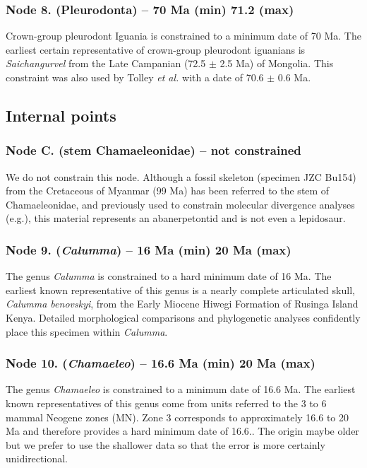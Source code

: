 \documentclass[a4paper, 12pt]{article}
\begin{document}
\subsubsection*{Node 8. (Pleurodonta) – 70 Ma (min) 71.2 (max)}
Crown-group pleurodont Iguania is constrained to a minimum date of 70 Ma. The earliest certain representative of crown-group pleurodont iguanians is \textit{Saichangurvel}\cite{conrad2007complete} from the Late Campanian (72.5 $\pm$ 2.5 Ma) of Mongolia. This constraint was also used by Tolley \textit{et al.}\cite{tolley2013large} with a date of 70.6 $\pm$ 0.6 Ma.
 
\subsection{Internal points}
\subsubsection*{Node C. (stem Chamaeleonidae) – not constrained}
We do not constrain this node. Although a fossil skeleton (specimen JZC Bu154) from the Cretaceous of Myanmar (99 Ma) has been referred to the stem of Chamaeleonidae\cite{daza2016mid}, and previously used to constrain molecular divergence analyses (e.g.\cite{skawinski2017evolution}), this material represents an abanerpetontid and is not even a lepidosaur\cite{daza2020enigmatic}.
 
\subsubsection*{Node 9. (\textit{Calumma}) – 16 Ma (min) 20 Ma (max)}
The genus \textit{Calumma} is constrained to a hard minimum date of 16 Ma. The earliest known representative of this genus is a nearly complete articulated skull, \textit{Calumma benovskyi}, from the Early Miocene Hiwegi Formation of Rusinga Island Kenya\cite{vcervnansky2020only}. Detailed morphological comparisons and phylogenetic analyses confidently place this specimen within \textit{Calumma}\cite{vcervnansky2020only}.
 
\subsubsection*{Node 10. (\textit{Chamaeleo}) – 16.6 Ma (min) 20 Ma (max)}
The genus \textit{Chamaeleo} is constrained to a minimum date of 16.6 Ma. The earliest known representatives of this genus come from units referred to the 3 to 6 mammal Neogene zones (MN)\cite{vcervnansky2010revision,bolet2013fossil}. Zone 3 corresponds to approximately 16.6 to 20 Ma and therefore provides a hard minimum date of 16.6.\cite{van2011biostratigraphy}. The origin maybe older but we prefer to use the shallower data so that the error is more certainly unidirectional.
\end{document}
